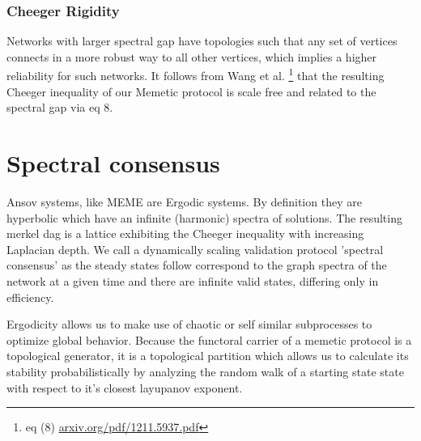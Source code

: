 \documentclass{article}
\begin{document}
\subsubsection{Cheeger Rigidity}
Networks with larger spectral gap have topologies such that any set of vertices connects in a more robust way to all other vertices, which implies a higher reliability for such networks. It follows from Wang et al. \footnote{eq (8) \url{arxiv.org/pdf/1211.5937.pdf}} that the resulting Cheeger inequality of our Memetic protocol is scale free and related to the spectral gap via eq 8. 

\section{Spectral consensus}
Ansov systems, like MEME are Ergodic systems. By definition they are hyperbolic which have an infinite (harmonic) spectra of solutions. The resulting merkel dag is a lattice exhibiting the Cheeger inequality with increasing Laplacian depth. We call a dynamically scaling validation protocol 'spectral consensus' as the steady states follow correspond to the graph spectra of the network at a given time and there are infinite valid states, differing only in efficiency.

Ergodicity allows us to make use of chaotic or self similar subprocesses to optimize global behavior. Because the functoral carrier of a memetic protocol is a topological generator, it is a topological partition which allows us to calculate its stability probabilistically by analyzing the random walk of a starting state state with respect to it's closest layupanov exponent. 


\end{document}
